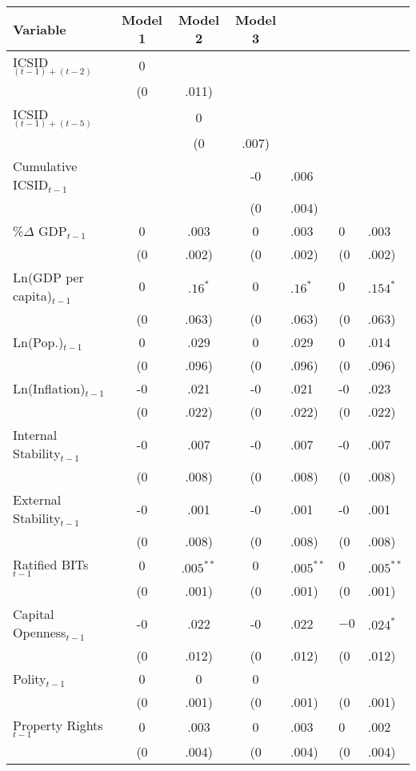 \begin{table}[ht]
\centering
{\footnotesize
\begin{tabular}{lccc}
 Variable & Model 1 & Model 2 & Model 3 \\ 
  \hline
\hline
ICSID$_{(t-1) + (t-2)}$ & 0 &  &  \\ 
   & (0&.011) &  &  \\ 
  ICSID$_{(t-1) + (t-5)}$ &  & 0 &  \\ 
   &  & (0&.007) &  \\ 
  Cumulative ICSID$_{t-1}$ &  &  & -0&.006 \\ 
   &  &  & (0&.004) \\ 
  \%$\Delta$ GDP$_{t-1}$ & 0&.003 & 0&.003 & 0&.003 \\ 
   & (0&.002) & (0&.002) & (0&.002) \\ 
  Ln(GDP per capita)$_{t-1}$ & $0$&$.16^{\ast}$ & $0$&$.16^{\ast}$ & $0$&$.154^{\ast}$ \\ 
   & (0&.063) & (0&.063) & (0&.063) \\ 
  Ln(Pop.)$_{t-1}$ & 0&.029 & 0&.029 & 0&.014 \\ 
   & (0&.096) & (0&.096) & (0&.096) \\ 
  Ln(Inflation)$_{t-1}$ & -0&.021 & -0&.021 & -0&.023 \\ 
   & (0&.022) & (0&.022) & (0&.022) \\ 
  Internal Stability$_{t-1}$ & -0&.007 & -0&.007 & -0&.007 \\ 
   & (0&.008) & (0&.008) & (0&.008) \\ 
  External Stability$_{t-1}$ & -0&.001 & -0&.001 & -0&.001 \\ 
   & (0&.008) & (0&.008) & (0&.008) \\ 
  Ratified BITs$_{t-1}$ & $0$&$.005^{\ast\ast}$ & $0$&$.005^{\ast\ast}$ & $0$&$.005^{\ast\ast}$ \\ 
   & (0&.001) & (0&.001) & (0&.001) \\ 
  Capital Openness$_{t-1}$ & -0&.022 & -0&.022 & $-0$&$.024^{\ast}$ \\ 
   & (0&.012) & (0&.012) & (0&.012) \\ 
  Polity$_{t-1}$ & 0 & 0 & 0 \\ 
   & (0&.001) & (0&.001) & (0&.001) \\ 
  Property Rights$_{t-1}$ & 0&.003 & 0&.003 & 0&.002 \\ 
   & (0&.004) & (0&.004) & (0&.004) \\ 

\end{tabular}}
\end{table}
